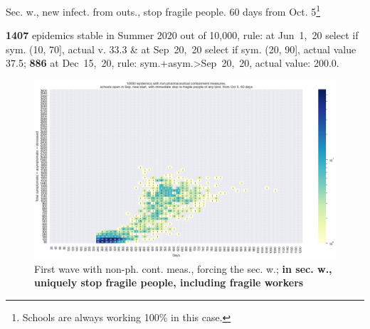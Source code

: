 \documentclass[9pt]{beamer}
\begin{document}
\begin{frame}{Sec. w., new infect. from outs., stop fragile people. 60  days from Oct. 5\footnote{Schools are always working 100\% in this case.}}


\textbf{1407} {\tiny epidemics stable in Summer 2020 out of 10,000, rule: at Jun~1,~20 select if sym. (10, 70], actual v. 33.3 \& at Sep~20,~20 select if sym. (20, 90], actual value 37.5;} \textbf{886} {\tiny at Dec~15,~20, rule: sym.+asym.>Sep~20,~20, actual value: 200.0.}

\begin{figure}[H]
\center
\includegraphics[scale=0.17]{10kForceWave2NoFragOct5for60d.png}
\caption{First wave with non-ph. cont. meas., forcing the sec. w.; \textbf{in sec. w., uniquely stop fragile people, including fragile workers}} 
\label{selForceWave2NoFrag}
\end{figure}



\end{frame}
\end{document}
